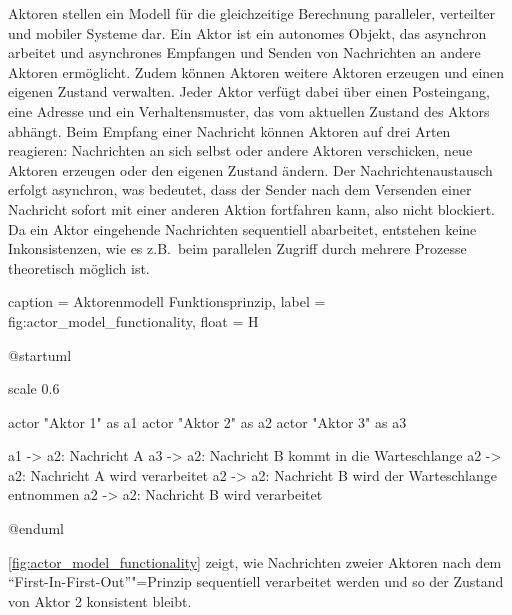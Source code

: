Aktoren stellen ein Modell für die gleichzeitige Berechnung paralleler, verteilter und mobiler Systeme dar.
Ein Aktor ist ein autonomes Objekt, das asynchron arbeitet und asynchrones Empfangen und Senden von Nachrichten an andere Aktoren ermöglicht.
Zudem können Aktoren weitere Aktoren erzeugen und einen eigenen Zustand verwalten.
Jeder Aktor verfügt dabei über einen Posteingang, eine Adresse und ein Verhaltensmuster, das vom aktuellen Zustand des Aktors abhängt.
Beim Empfang einer Nachricht können Aktoren auf drei Arten reagieren:
Nachrichten an sich selbst oder andere Aktoren verschicken, neue Aktoren erzeugen oder den eigenen Zustand ändern.
Der Nachrichtenaustausch erfolgt asynchron, was bedeutet, dass der Sender nach dem Versenden einer Nachricht sofort mit einer anderen Aktion fortfahren kann, also nicht blockiert.
Da ein Aktor eingehende Nachrichten sequentiell abarbeitet, entstehen keine Inkonsistenzen, wie es z.B.\ beim parallelen Zugriff durch mehrere Prozesse theoretisch möglich ist.

\begin{dhbwfigure}{%
    caption	= Aktorenmodell Funktionsprinzip,
    label	= fig:actor_model_functionality,
    float   = H
}
\begin{plantuml}
@startuml

scale 0.6

actor "Aktor 1" as a1
actor "Aktor 2" as a2
actor "Aktor 3" as a3

a1 -> a2: Nachricht A
a3 -> a2: Nachricht B kommt in die Warteschlange
a2 -> a2: Nachricht A wird verarbeitet
a2 -> a2: Nachricht B wird der Warteschlange entnommen
a2 -> a2: Nachricht B wird verarbeitet

@enduml
\end{plantuml}
\end{dhbwfigure}

\autoref{fig:actor_model_functionality} zeigt, wie Nachrichten zweier Aktoren nach dem \enquote{First-In-First-Out}"=Prinzip sequentiell verarbeitet werden und so der Zustand von Aktor 2 konsistent bleibt.
